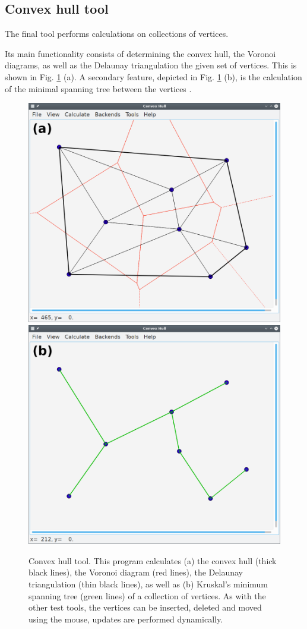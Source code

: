 \subsection{Convex hull tool}
\label{sec:tests_hull}
The final tool performs calculations on collections of vertices.

Its main functionality consists of determining the convex hull, the Voronoi diagrams, 
as well as the Delaunay triangulation the given set of vertices.
This is shown in Fig. \ref{fig:hullgui} (a).
A secondary feature, depicted in Fig. \ref{fig:hullgui} (b), is the calculation of 
the minimal spanning tree between the vertices \cite{TODO}.


\begin{figure}[h]
	\centering
	\includegraphics[width = 0.49 \textwidth]{figures/hullgui_voro}
	\hspace{0.05cm}
	\includegraphics[width = 0.49 \textwidth]{figures/hullgui_kruskal}
	\caption[Convex hull tool.]{Convex hull tool.
		This program calculates 
		(a) the convex hull (thick black lines), the Voronoi diagram (red lines), 
			the Delaunay triangulation (thin black lines), as well as
		(b) Kruskal's minimum spanning tree (green lines)
		of a collection of vertices.
		As with the other test tools, the vertices can be inserted, deleted and moved 
		using the mouse, updates are performed dynamically.
		\label{fig:hullgui}}
\end{figure}




